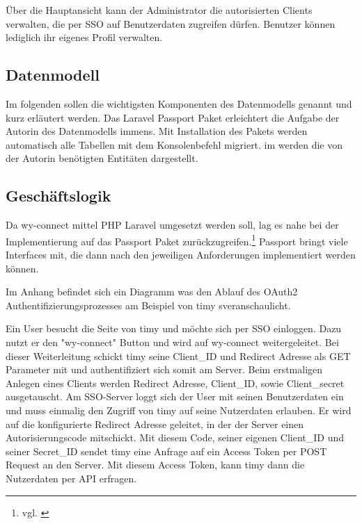 Über die Hauptansicht kann der Administrator die autorisierten Clients verwalten, die per \acs{SSO} auf  Benutzerdaten zugreifen dürfen. Benutzer können lediglich ihr eigenes Profil verwalten.

\subsection{Datenmodell}
\label{sec:Datenmodell}

Im folgenden sollen die wichtigsten Komponenten des Datenmodells genannt und kurz erläutert werden. 
Das Laravel Passport Paket erleichtert die Aufgabe der Autorin des Datenmodells immens. Mit Installation des Pakets werden automatisch alle Tabellen mit dem Konsolenbefehl  migriert. im  werden die von der Autorin benötigten Entitäten dargestellt. 


\subsection{Geschäftslogik}
\label{sec:Geschaeftslogik}

Da wy-connect mittel \acs{PHP} Laravel umgesetzt werden soll, lag es nahe bei der Implementierung auf das Passport Paket zurückzugreifen.\footnote{vgl. \cite{Passport}}
Passport bringt viele Interfaces mit, die dann nach den jeweiligen Anforderungen implementiert werden können. 

Im Anhang  befindet sich ein Diagramm was den Ablauf des OAuth2 Authentifizierungsprozesses  am Beispiel von timy sveranschaulicht. 

Ein User besucht die Seite von timy und möchte sich per \acs{SSO} einloggen. Dazu nutzt er den "wy-connect" Button und wird auf wy-connect weitergeleitet. Bei dieser Weiterleitung schickt timy seine Client\_ID und Redirect Adresse als GET Parameter mit und authentifiziert sich somit am Server. 
Beim erstmaligen Anlegen eines Clients werden Redirect Adresse, Client\_ID, sowie Client\_secret ausgetauscht. 
Am \acs{SSO}-Server loggt sich der User mit seinen Benutzerdaten ein und muss einmalig den Zugriff von timy auf seine Nutzerdaten erlauben. 
Er wird auf die konfigurierte Redirect Adresse geleitet, in der der Server einen Autorisierungscode mitschickt. Mit diesem Code, seiner eigenen Client\_ID und seiner Secret\_ID sendet timy eine Anfrage auf ein Access Token per POST Request an den Server. Mit diesem Access Token, kann timy dann die Nutzerdaten per API erfragen. 

